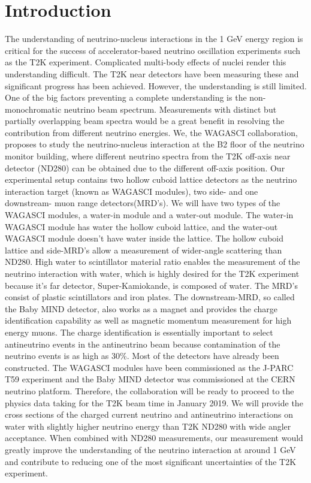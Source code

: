 \section{Introduction}

The understanding of neutrino-nucleus interactions in the 1 GeV energy region is critical for the success
of accelerator-based neutrino oscillation experiments such as the T2K experiment.
Complicated multi-body effects of nuclei render this understanding difficult.
The T2K near detectors have been measuring these and significant progress has been achieved.
However, the understanding is still limited.
One of the big factors preventing a complete understanding is the non-monochromatic neutrino beam spectrum.
Measurements with distinct but partially overlapping beam spectra would be a great benefit
in resolving the contribution from different neutrino energies.
We, the WAGASCI collaboration, proposes to study the neutrino-nucleus interaction
at the B2 floor of the neutrino monitor building, where different neutrino spectra from the T2K off-axis near detector (ND280) can be obtained due to the different off-axis position.
Our experimental setup contains two hollow cuboid lattice detectors as the neutrino interaction target (known as WAGASCI modules), two side- and one downstream- muon range detectors(MRD's).
We will have two types of the WAGASCI modules, a water-in module and a water-out module.
The water-in WAGASCI module has water the hollow cuboid lattice, and the water-out WAGASCI module doesn't have water inside the lattice.
The hollow cuboid lattice and side-MRD's allow a measurement of  wider-angle scattering than ND280.
High water to scintillator material ratio enables the measurement of the neutrino interaction with water, which is highly desired for the T2K experiment because it's far detector, Super-Kamiokande, is composed of water.
The MRD's consist of plastic scintillators and iron plates.
The downstream-MRD, so called the Baby MIND detector, also works as a magnet and provides the charge identification capability as well as magnetic momentum measurement for high energy muons.
The charge identification is essentially important to select antineutrino events in the antineutrino beam
because contamination of the neutrino events is as high as 30\%.
Most of the detectors have already been constructed.
The WAGASCI modules have been commissioned as the J-PARC T59 experiment and the Baby MIND detector was commissioned at the CERN neutrino platform.
Therefore, the collaboration will be ready to proceed to the physics data taking for the T2K beam time in January 2019.
We will provide the cross sections of the charged current neutrino and antineutrino interactions on water
with slightly higher neutrino energy than T2K ND280 with wide angler acceptance.
When combined with ND280 measurements, our measurement would greatly improve the understanding of the neutrino interaction
at around 1 GeV 
and contribute to reducing one of the most significant uncertainties of the T2K experiment.

